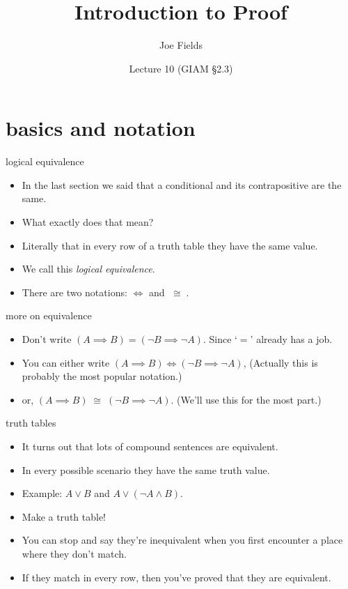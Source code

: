 \documentclass[landscape]{beamer}
\author{Joe Fields}
\title{Introduction to Proof}
\date{Lecture 10 (GIAM \S 2.3)}
\institute[SCSU]{ {\tt fieldsj1@southernct.edu} }
\begin{document}
\begin{frame}[plain]
  \titlepage
\end{frame}


\section{basics and notation}

\begin{frame}{logical equivalence}
\begin{itemize}
\item In the last section we said that a conditional and its contrapositive are the same. \pause
\item What exactly does that mean?\pause
\item Literally that in every row of a truth table they have the same value.\pause
\item We call this {\em logical equivalence}.\pause
\item There are two notations: $\iff$ and $\; \cong \;$. \pause
\end{itemize}
\end{frame}

\begin{frame}{more on equivalence}
\begin{itemize}
\item Don't write $(A \implies B) = (\lnot B \implies \lnot A)$. \pause Since `$=$' already has a job. \pause
\item You can either write $(A \implies B) \iff (\lnot B \implies \lnot A)$, \pause (Actually this is probably the most popular notation.) \pause
\item or, $(A \implies B) \; \cong \; (\lnot B \implies \lnot A)$. \pause (We'll use this for the most part.) 
\end{itemize}
\end{frame}

\begin{frame}{truth tables}
\begin{itemize}
\item It turns out that lots of compound sentences are equivalent. \pause
\item In every possible scenario they have the same truth value. \pause
\item Example: $A\lor B$ and $A \lor (\lnot A \land B)$.\pause
\item Make a truth table! \pause
\item You can stop and say they're inequivalent when you first encounter a place where they don't match. \pause
\item If they match in every row, then you've proved that they are equivalent.
\end{itemize}
\end{frame}
\end{document}

